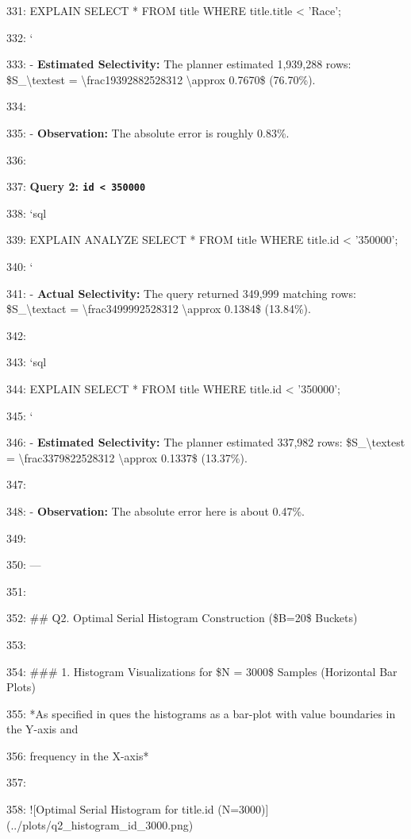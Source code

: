 \documentclass[11pt,a4paper]{article}
\begin{document}
331: EXPLAIN SELECT * FROM title WHERE title.title < 'Race';

332: \texttt{}`

333: - \textbf{Estimated Selectivity:} The planner estimated 1,939,288 rows: \$S\_{\textbackslash{}text{est}} = \textbackslash{}frac{1939288}{2528312} \textbackslash{}approx 0.7670\$ (76.70\%).

334:

335: - \textbf{Observation:} The absolute error is roughly 0.83\%.

336:

337: \textbf{Query 2: \texttt{id < 350000}}

338: \texttt{}`sql

339: EXPLAIN ANALYZE SELECT * FROM title WHERE title.id < '350000';

340: \texttt{}`

341: - \textbf{Actual Selectivity:} The query returned 349,999 matching rows: \$S\_{\textbackslash{}text{act}} = \textbackslash{}frac{349999}{2528312} \textbackslash{}approx 0.1384\$ (13.84\%).

342:

343: \texttt{}`sql

344: EXPLAIN SELECT * FROM title WHERE title.id < '350000';

345: \texttt{}`

346: - \textbf{Estimated Selectivity:} The planner estimated 337,982 rows: \$S\_{\textbackslash{}text{est}} = \textbackslash{}frac{337982}{2528312} \textbackslash{}approx 0.1337\$ (13.37\%).

347:

348: - \textbf{Observation:} The absolute error here is about 0.47\%.

349:

350: ---

351:

352: \#\# Q2. Optimal Serial Histogram Construction (\$B=20\$ Buckets)

353:

354: \#\#\# 1. Histogram Visualizations for \$N = 3000\$ Samples (Horizontal Bar Plots)

355: *As specified in ques the histograms as a bar-plot with value boundaries in the Y-axis and

356: frequency in the X-axis*

357:

358: ![Optimal Serial Histogram for title.id (N=3000)](../plots/q2\_histogram\_id\_3000.png)
\end{document}
